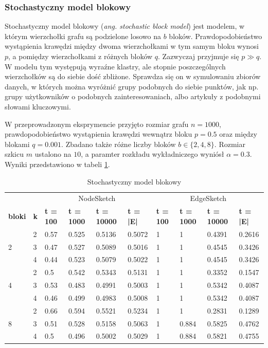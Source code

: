     \subsubsection{Stochastyczny model blokowy}
    Stochastyczny model blokowy (\emph{ang. stochastic block model}) jest modelem, w którym wierzchołki grafu są podzielone losowo na $b$ bloków. Prawdopodobieństwo wystąpienia krawędzi między dwoma wierzchołkami w tym samym bloku wynosi $p$, a pomiędzy wierzchołkami z różnych bloków $q$. Zazwyczaj przyjmuje się $p \gg q$. W modelu tym występują wyraźne klastry, ale stopnie poszczególnych wierzchołków są do siebie dość zbliżone. Sprawdza się on w symulowaniu zbiorów danych, w których można wyróżnić grupy podobnych do siebie punktów, jak np. grupy użytkowników o podobnych zainteresowaniach, albo artykuły z podobnymi słowami kluczowymi. 

    W przeprowadzonym eksprymencie przyjęto rozmiar grafu $n = 1000$, prawdopodobieństwo wystąpienia krawędzi wewnątrz bloku $p = 0.5$ oraz między blokami $q = 0.001$. Zbadano także różne liczby bloków $b \in \{2,4,8\}$. Rozmiar szkicu $m$ ustalono na $10$, a paramter rozkładu wykładniczego wyniósł $\alpha = 0.3$. Wyniki przedstawiono w tabeli \ref{tab:stochastic_block_model}.

    \begin{table}[!ht]
        \small
        \centering
        \begin{tabular}{|l|l|l|l|l|l|l|l|l|l|}
        \hline
            & & \multicolumn{4}{c|}{NodeSketch} & \multicolumn{4}{c|}{EdgeSketch} \\ \cline{1-10}
            \textbf{bloki} & \textbf{k} & \textbf{t = 100} & \textbf{t = 1000} & \textbf{t = 10000} & \textbf{t = |E|} & \textbf{t = 100} & \textbf{t = 1000} & \textbf{t = 10000} & \textbf{t = |E|} \\ \hline\hline
            \multirow{3}{*}{2} & 2 & 0.57 & 0.525 & 0.5136 & 0.5072 & 1 & 1 & 0.4391 & 0.2616 \\ \cline{2-10}
             & 3 & 0.47 & 0.527 & 0.5089 & 0.5016 & 1 & 1 & 0.4545 & 0.3426 \\ \cline{2-10}
             & 4 & 0.44 & 0.523 & 0.5079 & 0.5022 & 1 & 1 & 0.4545 & 0.3426 \\ \hline\hline
            \multirow{3}{*}{4} & 2 & 0.5 & 0.542 & 0.5343 & 0.5131 & 1 & 1 & 0.3352 & 0.1547 \\ \cline{2-10}
             & 3 & 0.53 & 0.483 & 0.4991 & 0.5003 & 1 & 1 & 0.5342 & 0.4087 \\ \cline{2-10}
             & 4 & 0.46 & 0.499 & 0.4983 & 0.5008 & 1 & 1 & 0.5342 & 0.4087 \\ \hline\hline
            \multirow{3}{*}{8} & 2 & 0.66 & 0.594 & 0.5521 & 0.5234 & 1 & 1 & 0.2831 & 0.1289 \\ \cline{2-10}
             & 3 & 0.51 & 0.528 & 0.5158 & 0.5063 & 1 & 0.884 & 0.5825 & 0.4762 \\ \cline{2-10}
             & 4 & 0.5 & 0.496 & 0.5002 & 0.5029 & 1 & 0.884 & 0.5821 & 0.4755 \\ \hline
        \end{tabular}
        \caption{Stochastyczny model blokowy}
        \label{tab:stochastic_block_model}
    \end{table}

